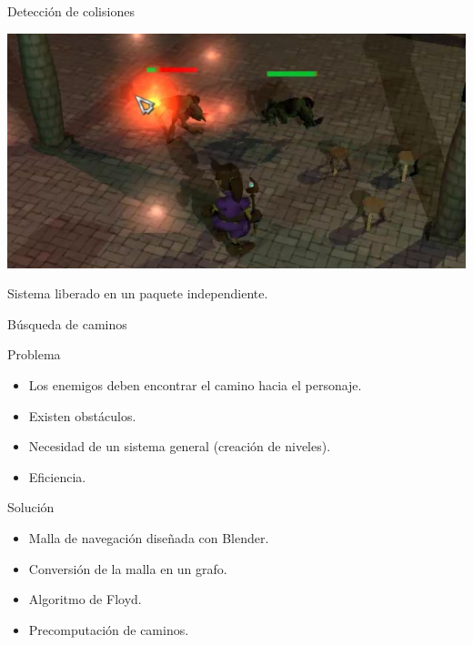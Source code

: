 \documentclass[green]{beamer}
\begin{document}
\begin{frame}{Detección de colisiones}
    
    \begin{center}
	\includegraphics[scale=0.45]{img/siontower-colisiones.png}
    \end{center}
    
    Sistema liberado en un paquete independiente.
    
\end{frame}
    
    
\begin{frame}{Búsqueda de caminos}
    
    \begin{alertblock}{Problema}
	\begin{itemize}
	    \item Los enemigos deben encontrar el camino hacia el personaje.
	    \item Existen obstáculos.
	    \item Necesidad de un sistema general (creación de niveles).
	    \item Eficiencia.
	\end{itemize}
    \end{alertblock}
    
    \begin{block}{Solución}
	\begin{itemize}
	    \item Malla de navegación diseñada con Blender.
	    \item Conversión de la malla en un grafo.
	    \item Algoritmo de Floyd.
	    \item Precomputación de caminos.
	\end{itemize}
    \end{block}
\end{frame}
\end{document}
